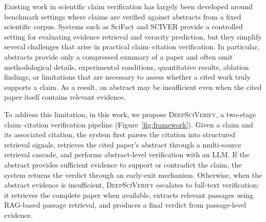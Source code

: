 \documentclass{article}
\theoremstyle{plain}
\theoremstyle{definition}
\theoremstyle{remark}
\begin{document}
Existing work in scientific claim verification has largely been developed around benchmark settings where claims are verified against abstracts from a fixed scientific corpus. Systems such as SciFact \cite{wadden2022scifact} and SCIVER \cite{wang2025sciver} provide a controlled setting for evaluating evidence retrieval and veracity prediction, but they simplify several challenges that arise in practical claim--citation verification. In particular, abstracts provide only a compressed summary of a paper and often omit methodological details, experimental conditions, quantitative results, ablation findings, or limitations that are necessary to assess whether a cited work truly supports a claim. As a result, an abstract may be insufficient even when the cited paper itself contains relevant evidence. 

To address this limitation, in this work, we propose \textsc{DeepSciVerify}, a two-stage claim--citation verification pipeline (Figure~\ref{fig:framework}). Given a claim and its associated citation, the system first parses the citation into structured retrieval signals, retrieves the cited paper's abstract through a multi-source retrieval cascade, and performs abstract-level verification with an LLM. If the abstract provides sufficient evidence to support or contradict the claim, the system returns the verdict through an early-exit mechanism. Otherwise, when the abstract evidence is insufficient, \textsc{DeepSciVerify} escalates to full-text verification: it retrieves the complete paper when available, extracts relevant passages using RAG-based passage retrieval, and produces a final verdict from passage-level evidence.
\end{document}
